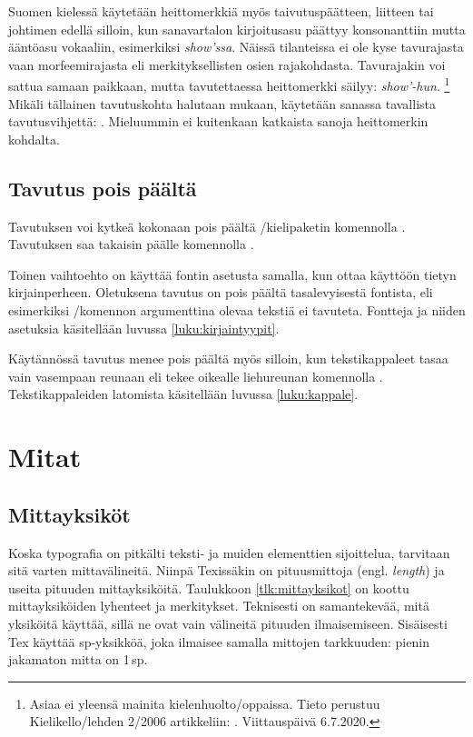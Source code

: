 Suomen kielessä käytetään heittomerkkiä myös taivutuspäätteen, liitteen
tai johtimen edellä silloin, kun sanavartalon kir\-joi\-tus\-asu päättyy
konsonanttiin mutta ääntö\-asu vokaaliin, esimerkiksi \emph{show'ssa}.
Näissä tilanteissa ei ole kyse tavurajasta vaan morfeemirajasta eli
merkityksellisten osien rajakohdasta. Tavurajakin voi sattua samaan
paikkaan, mutta tavutettaessa heittomerkki säilyy: \emph{show'-hun}.%
\footnote{Asiaa ei yleensä mainita kielenhuolto\-/oppaissa. Tieto
  perustuu Kielikello\-/lehden 2/2006 artikkeliin:
  . Viittauspäivä
  6.7.2020.} Mikäli tällainen tavutuskohta halutaan mukaan, käytetään
sanassa tavallista tavutusvihjettä: . Mieluummin
ei kuitenkaan katkaista sanoja heittomerkin kohdalta.

\subsection{Tavutus pois päältä}

Tavutuksen voi kytkeä kokonaan pois päältä
\-/kielipaketin komennolla%
 . Tavutuksen saa takaisin päälle komennolla
.

Toinen vaihtoehto on käyttää fontin asetusta  samalla, kun ottaa käyttöön tietyn kirjainperheen. Oletuksena
tavutus on pois päältä tasalevyisestä fontista, eli esimerkiksi
\-/komennon argumenttina olevaa tekstiä ei
tavuteta. Fontteja ja niiden asetuksia käsitellään luvussa
\ref{luku:kirjaintyypit}.

Käytännössä tavutus menee pois päältä myös silloin, kun tekstikappaleet
tasaa vain vasempaan reunaan eli tekee oikealle liehureunan komennolla
. Tekstikappaleiden latomista käsitellään
luvussa \ref{luku:kappale}.

\section{Mitat}
\label{luku:mitat}

\subsection{Mittayksiköt}

Koska typografia on pitkälti teksti- ja muiden elementtien sijoittelua,
tarvitaan sitä varten mittavälineitä. Niinpä Texissäkin on pituusmittoja
(engl. \emph{length}) ja useita pituuden mittayksiköitä. Taulukkoon
\ref{tlk:mittayksikot} on koottu mittayksiköiden lyhenteet ja
merkitykset. Teknisesti on samantekevää, mitä yksiköitä käyttää, sillä
ne ovat vain välineitä pituuden ilmaisemiseen. Sisäisesti Tex käyttää
sp-yksikköä, joka ilmaisee samalla mittojen tarkkuuden: pienin jakamaton
mitta on 1\,sp.

